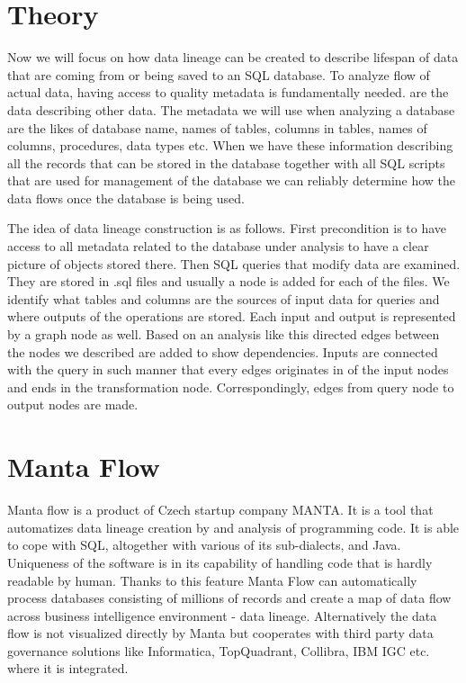 
\section{Theory}

Now we will focus on how data lineage can be created to describe lifespan of data that are coming from or being saved to an SQL database.
To analyze flow of actual data, having access to quality metadata is fundamentally needed.
 are the data describing other data. The metadata we will use when analyzing a database are the likes of database name, names of tables, columns in tables, names of columns, procedures, data types etc.
When we have these information describing all the records that can be stored in the database together with all SQL scripts that are used for management of the database we can reliably determine how the data flows once the database is being used.

The idea of data lineage construction is as follows. First precondition is to have access to all metadata related to the database under analysis to have a clear picture of objects stored there. 
Then SQL queries that modify data are examined. They are stored in .sql files and usually a node is added for each of the files. We identify what tables and columns are the sources of input data for queries and where outputs of the operations are stored. Each input and output is represented by a graph node as well. Based on an analysis like this directed edges between the nodes we described are added to show dependencies. Inputs are connected with the query in such manner that every edges originates in of the input nodes and ends in the transformation node. Correspondingly, edges from query node to output nodes are made.




\section{Manta Flow}

Manta flow is a product of Czech startup company MANTA. It is a tool that automatizes data lineage creation by and analysis of programming code. It is able to cope with SQL, altogether with various of its sub-dialects, and Java. Uniqueness of the software is in its capability of handling code that is hardly readable by human. Thanks to this feature Manta Flow can automatically process databases consisting of millions of records and create a map of data flow across business intelligence environment - data lineage.
Alternatively the data flow is not visualized directly by Manta but cooperates with third party data governance solutions like Informatica, TopQuadrant, Collibra, IBM IGC etc. where it is integrated.

